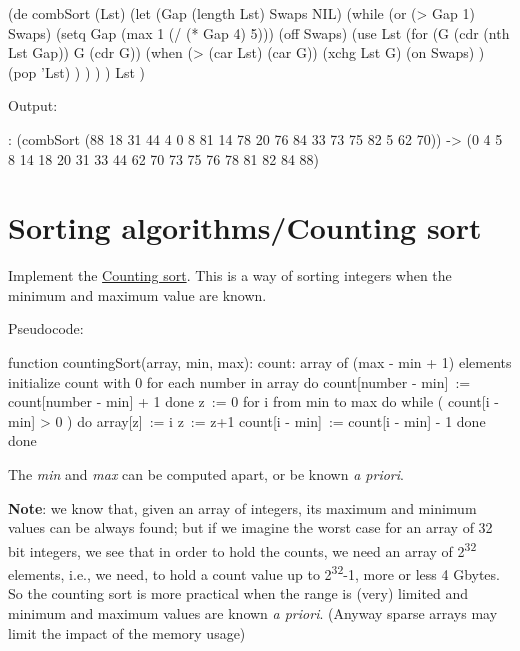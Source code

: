 \begin{itemize}
\begin{wideverbatim}

(de combSort (Lst)
   (let (Gap (length Lst)  Swaps NIL)
      (while (or (> Gap 1) Swaps)
         (setq Gap (max 1 (/ (* Gap 4) 5)))
         (off Swaps)
         (use Lst
            (for (G (cdr (nth Lst Gap))  G  (cdr G))
               (when (> (car Lst) (car G))
                  (xchg Lst G)
                  (on Swaps) )
               (pop 'Lst) ) ) ) )
   Lst )

Output:

: (combSort (88 18 31 44 4 0 8 81 14 78 20 76 84 33 73 75 82 5 62 70))
-> (0 4 5 8 14 18 20 31 33 44 62 70 73 75 76 78 81 82 84 88)

\end{wideverbatim}

\pagebreak{}
\section*{Sorting algorithms/Counting sort}

Implement the
\href{http://en.wikipedia.org/wiki/Counting\_sort}{Counting sort}.
This is a way of sorting integers when the minimum and maximum value
are known.

Pseudocode:

\begin{wideverbatim}
function countingSort(array, min, max):
    count: array of (max - min + 1) elements
    initialize count with 0
    for each number in array do
        count[number - min] := count[number - min] + 1
    done
    z := 0
    for i from min to max do
        while ( count[i - min] > 0 ) do
            array[z] := i
            z := z+1
            count[i - min] := count[i - min] - 1
        done
    done
\end{wideverbatim}

The \emph{min} and \emph{max} can be computed apart, or be known \emph{a
priori}.

\textbf{Note}: we know that, given an array of integers, its maximum and
minimum values can be always found; but if we imagine the worst case for
an array of 32 bit integers, we see that in order to hold the counts, we
need an array of 2\textsuperscript{32} elements, i.e., we need, to hold
a count value up to 2\textsuperscript{32}-1, more or less 4 Gbytes. So
the counting sort is more practical when the range is (very) limited and
minimum and maximum values are known \emph{a priori}. (Anyway sparse
arrays may limit the impact of the memory usage)



\end{itemize}
